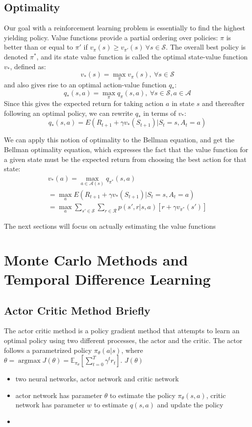\documentclass[12pt, reqno]{article}
\theoremstyle{plain}    \newtheorem{theorem}{Theorem}[section]
\theoremstyle{plain}    \newtheorem{lemma}[theorem]{Lemma}
\theoremstyle{plain}    \newtheorem{claim}[theorem]{Claim}
\theoremstyle{plain}    \newtheorem{definition}{Definition}[section]
\theoremstyle{plain}    \newtheorem{proposition}[theorem]{Proposition}
\theoremstyle{plain}    \newtheorem{corollary}[theorem]{Corollary}
\theoremstyle{plain}    \newtheorem{example}[definition]{Example}
\DeclareMathOperator*{\argmax}{argmax}
\numberwithin{equation}{section}
\begin{document}
\subsection{Optimality}

Our goal with a reinforcement learning problem is essentially to find the
highest yielding policy. Value functions provide a partial ordering over
policies: \(\pi\) is better than or equal to \(\pi'\) if \(v_{\pi}(s) \ge
v_{\pi'}(s) \ \forall s \in \mathcal{S}\). The overall best policy is denoted
\(\pi^*\), and its state value function is called the optimal state-value
function \(v_*\), defined as:
\[v_*(s) = \max_{\pi}v_{\pi}(s), \ \forall s \in \mathcal{S} \]
and also gives rise to an optimal action-value function \(q_*\):
\[q_*(s,a) = \max_{\pi}q_{\pi}(s,a), \ \forall s \in \mathcal{S}, a \in \mathcal{A}\]
Since this gives the 
expected return for taking action \(a\) in state \(s\) and thereafter following
an optimal policy, we can rewrite \(q_*\) in terms of \(v_*\):
\[q_{*}(s,a) = E(R_{t+1} + \gamma v_{*}(S_{t+1})|S_t = s, A_t = a)\]

We can apply this notion of optimality to the Bellman equation, and get the
Bellman optimality equation, which expresses the fact that the value function
for a given state must be the expected return from choosing the best action for
that state:
\begin{gather*}
	v_*(a) = \max_{a \in \mathcal{A}(s)}q_{\pi^*}(s,a) \\
	= \max_a E(R_{t+1} + \gamma v_{*}(S_{t+1})|S_t = s, A_t = a) \\
	= \max_a \sum_{s' \in \mathcal{S}}\sum_{r \in \mathcal{R}}p(s', r | s,a)[r + \gamma v_{\pi^*}(s')]
\end{gather*}

The next sections will focus on actually estimating the value functions 
\section{Monte Carlo Methods and Temporal Difference Learning}

\subsection{Actor Critic Method Briefly}
The actor critic method is a policy gradient method that attempts to learn an
optimal policy using two different processes, the actor and the critic.
The actor follows a parametrized policy \(\pi_{\theta}(a|s)\), where \(\theta =
\argmax J(\theta )=\mathbb {E} _{\pi _{\theta }}\left[\sum _{t=0}^{T}\gamma
^{t}r_{t}\right]\). \(J(\theta) \)
\begin{itemize}
	\item two neural networks, actor network and critic network
	\item actor network has parameter \(\theta\) to estimate the policy
	\(\pi_{\theta}(s,a)\), critic network has parameter \(w\) to estimate
	\(q(s,a)\) and update the policy
	\item 
\end{itemize}
\end{document}

